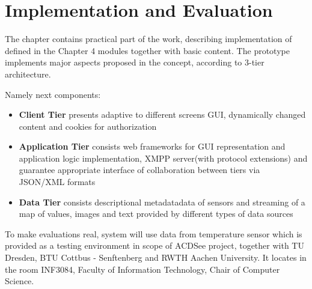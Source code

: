 \chapter{Implementation and Evaluation}
	The chapter contains practical part of the work, describing implementation of defined in the Chapter 4 modules together with basic content. The prototype implements major aspects proposed in the concept, according to 3-tier architecture. 

	Namely next components:
	 \begin{itemize}
		\item \textbf{Client Tier} presents adaptive to different screens GUI, dynamically changed content and cookies for authorization
		\item \textbf{Application Tier} consists web frameworks for GUI representation and application logic implementation, XMPP server(with protocol extensions) and guarantee appropriate interface of collaboration between tiers via JSON/XML formats
		\item \textbf{Data Tier} consists descriptional metadatadata of sensors and streaming of a map of values, images and text provided by different types of data sources
	\end{itemize}
	To make evaluations real, system will use data from temperature sensor which is provided as a testing environment in scope of ACDSee project, together with TU Dresden, BTU Cottbus - Senftenberg and RWTH Aachen University. It locates in the room INF3084, Faculty of Information Technology, Chair of Computer Science.


